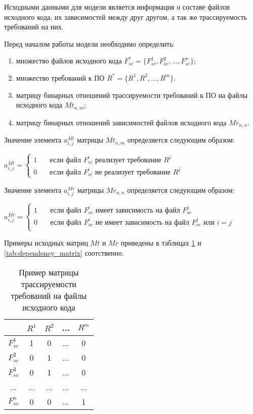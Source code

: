 Исходными данными для модели является информация о составе файлов исходного кода, их зависимостей между друг другом, а так же трассируемость требований на них.

Перед началом работы модели необходимо определить:
\begin{enumerate}
    \item множество файлов исходного кода $F_{sc}^* = \{F_{sc}^1, F_{sc}^2, ..., F_{sc}^{n}\}$;
    \item множество требований к ПО $R^* = \{R^1, R^2, ..., R^m\}$.
    \item матрицу бинарных отношений трассируемости требований к ПО на файлы исходного кода $Mt_{n, m}$;
    \item матрицу бинарных отношений зависимостей файлов исходного кода $Mr_{n,n}$.
\end{enumerate}

Значение элемента $a_{i,j}^{Mt}$ матрицы $Mt_{n,m}$ определяется следующим образом:

$
a_{i,j}^{Mt} = \begin{cases}
    1  & \quad \text{если файл } F_{sc}^i \text{ реализует требование } R^j\\
    0  & \quad \text{если файл } F_{sc}^i \text{ не реализует требование } R^j
  \end{cases}
$

Значение элемента $a_{i,j}^{Mr}$ матрицы $Mr_{n,n}$ определяется следующим образом:

$
a_{i,j}^{Mr} = \begin{cases}
    1  & \quad \text{если файл } F_{sc}^i \text{ имеет зависимость на файл } F_{sc}^j\\
    0  & \quad \text{если файл } F_{sc}^i \text{ не имеет зависимость на файл } F_{sc}^j \text{ или } i = j\\
  \end{cases}
$

Примеры исходных матриц $Mt$ и $Mr$ приведены в таблицах \ref{tab:requirements_traceability_matrix} и \ref{tab:dependency_matrix} соотственно.
\newpage
\begin{longtable}{|c|c|c|c|c|}
\caption{Пример матрицы трассируемости требований на файлы исходного кода}
\label{tab:requirements_traceability_matrix}\\
\hline
& \cellcolor{ash-grey} $R^1$ 
& \cellcolor{ash-grey} $R^2$ 
& ... 
& \cellcolor{ash-grey} $R^m$ \\
\hline
\cellcolor{platinum} $F_{sc}^1$ & \cellcolor{light-colar} 1 & 0 & ... & 0 \\
\hline
\cellcolor{platinum} $F_{sc}^2$ & 0 & \cellcolor{light-orange} 1 & ... & 0 \\
\hline
\cellcolor{platinum} $F_{sc}^3$ & 0 & \cellcolor{crayola} 1 & ... & 0 \\
\hline
... & ... & ... & ... & ... \\
\hline
\cellcolor{platinum} $F_{sc}^n$ & 0 & 0 & ... & \cellcolor{light-green} 1 \\
\hline
\end{longtable}

